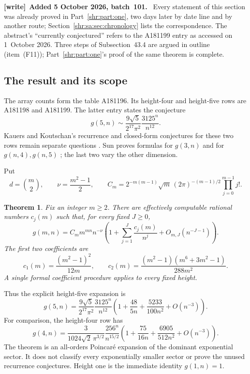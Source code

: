 \documentclass[11pt,letterpaper]{article}
\numberwithin{equation}{section}
\newtheorem{theorem}{Theorem}[section]
\theoremstyle{definition}
\newcommand{\1}{\mathbf 1}
\newenvironment{writenote}[1][]{\par\smallskip\begingroup\small
 \noindent\textbf{[write]}\if\relax\detokenize{#1}\relax\else~\textbf{#1.}\fi\ }%
 {\par\endgroup\smallskip}
\begin{document}
\begin{writenote}[Added 5 October 2026, batch~101]
Every statement of this section was already proved in
Part~\ref{shr:part:one}, two days later by date line and by another route;
Section~\ref{shr:sa:sec:chronology} lists the correspondence. The
abstract's ``currently conjectured'' refers to the A181199 entry as
accessed on 1~October 2026. Three steps of Subsection~43.4 are argued in
outline (item~(F11)); Part~\ref{shr:part:one}'s proof of the same theorem
is complete.
\end{writenote}

\subsection{The result and its scope}
The array counts form the table A181196. Its height-four and height-five rows are A181198 and A181199. The latter entry states the conjecture
\[
 g(5,n)\sim\frac{9\sqrt5}{2^{17}\pi^2}\frac{3125^n}{n^{12}}.
\]
Kauers and Koutschan's recurrence and closed-form conjectures for these two rows remain separate questions \cite{oeis198,oeis199,KK}. Sun proves formulas for $g(3,n)$ and for $g(n,4),g(n,5)$ \cite{Sun}; the last two vary the other dimension.

Put
\[
 d=\binom m2,\qquad \nu=\frac{m^2-1}{2},\qquad
 C_m=2^{-m(m-1)}\sqrt m\,(2\pi)^{-(m-1)/2}
          \prod_{j=0}^{m-1}j!.
\]
\begin{theorem}\label{shr:sa:thm:main}
Fix an integer $m\ge2$. There are effectively computable rational numbers $c_j(m)$ such that, for every fixed $J\ge0$,
\begin{equation}\label{shr:sa:eq:expansion}
 g(m,n)=C_m m^{mn}n^{-\nu}
 \left(1+\sum_{j=1}^J\frac{c_j(m)}{n^j}
                   +O_{m,J}(n^{-J-1})\right).
\end{equation}
The first two coefficients are
\begin{equation}\label{shr:sa:eq:c12}
 c_1(m)=\frac{(m^2-1)^2}{12m},\qquad
 c_2(m)=\frac{(m^2-1)(m^6+3m^2-1)}{288m^2}.
\end{equation}
A single formal coefficient procedure applies to every fixed height.
\end{theorem}
Thus the explicit height-five expansion is
\begin{equation}\label{shr:sa:eq:height5}
 g(5,n)=\frac{9\sqrt5}{2^{17}\pi^2}\frac{3125^n}{n^{12}}
 \left(1+\frac{48}{5n}+\frac{5233}{100n^2}+O(n^{-3})\right).
\end{equation}
For comparison, the height-four row has
\[
 g(4,n)=\frac{3}{1024\sqrt2\,\pi^{3/2}}\frac{256^n}{n^{15/2}}
 \left(1+\frac{75}{16n}+\frac{6905}{512n^2}+O(n^{-3})\right).
\]
The theorem is an all-orders Poincar\'e expansion of the dominant exponential sector. It does not classify every exponentially smaller sector or prove the unused recurrence conjectures. Height one is the immediate identity $g(1,n)=1$.
\end{document}
